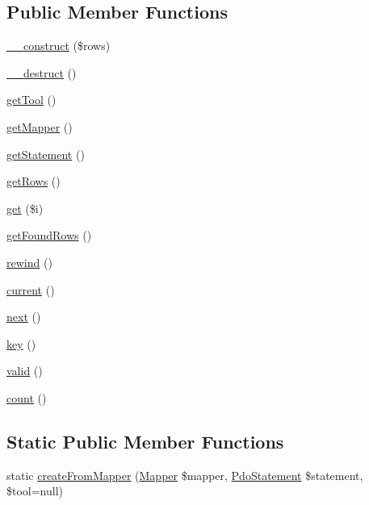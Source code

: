 \subsection*{Public Member Functions}
\begin{DoxyCompactItemize}
\item 
\hyperlink{classTk_1_1Db_1_1ArrayObject_abb0f4cf0e5b67ab269ec531ec0f4b26c}{\+\_\+\+\_\+construct} (\$rows)
\item 
\hyperlink{classTk_1_1Db_1_1ArrayObject_adece20b9b06bd2e72c3f756259727b4a}{\+\_\+\+\_\+destruct} ()
\item 
\hyperlink{classTk_1_1Db_1_1ArrayObject_a5d30be86a7f084af08ce394654420f1b}{get\+Tool} ()
\item 
\hyperlink{classTk_1_1Db_1_1ArrayObject_a39299215dd91c18be56088c37261ecbc}{get\+Mapper} ()
\item 
\hyperlink{classTk_1_1Db_1_1ArrayObject_ad9c2480c061101367b269b3b8411baca}{get\+Statement} ()
\item 
\hyperlink{classTk_1_1Db_1_1ArrayObject_ae3cb9c19eba638907ae6169ead2b2866}{get\+Rows} ()
\item 
\hyperlink{classTk_1_1Db_1_1ArrayObject_a0eb1a07df69e059c358046d9e65e386e}{get} (\$i)
\item 
\hyperlink{classTk_1_1Db_1_1ArrayObject_a7c9e49dde3edbc0bcb397732e7a8176a}{get\+Found\+Rows} ()
\item 
\hyperlink{classTk_1_1Db_1_1ArrayObject_a94b25c0762acb86915e91ff57b01ec61}{rewind} ()
\item 
\hyperlink{classTk_1_1Db_1_1ArrayObject_a3df0c0080e7647b730ae5b5cd102e0d9}{current} ()
\item 
\hyperlink{classTk_1_1Db_1_1ArrayObject_aa73eabffe8c021aa12509c83cf8ddc12}{next} ()
\item 
\hyperlink{classTk_1_1Db_1_1ArrayObject_a41cfb3c1f8c6f9cf2d7ea1d6244157e4}{key} ()
\item 
\hyperlink{classTk_1_1Db_1_1ArrayObject_ad7d1f285d9becc3d71eaa05e9121cb89}{valid} ()
\item 
\hyperlink{classTk_1_1Db_1_1ArrayObject_a62c881bb4e5e4c5067095dc036f124bc}{count} ()
\end{DoxyCompactItemize}
\subsection*{Static Public Member Functions}
\begin{DoxyCompactItemize}
\item 
static \hyperlink{classTk_1_1Db_1_1ArrayObject_acef9db6fcfae6404ac3b318b186e407d}{create\+From\+Mapper} (\hyperlink{classTk_1_1Db_1_1Mapper}{Mapper} \$mapper, \hyperlink{classTk_1_1Db_1_1PdoStatement}{Pdo\+Statement} \$statement, \$tool=null)
\end{DoxyCompactItemize}

